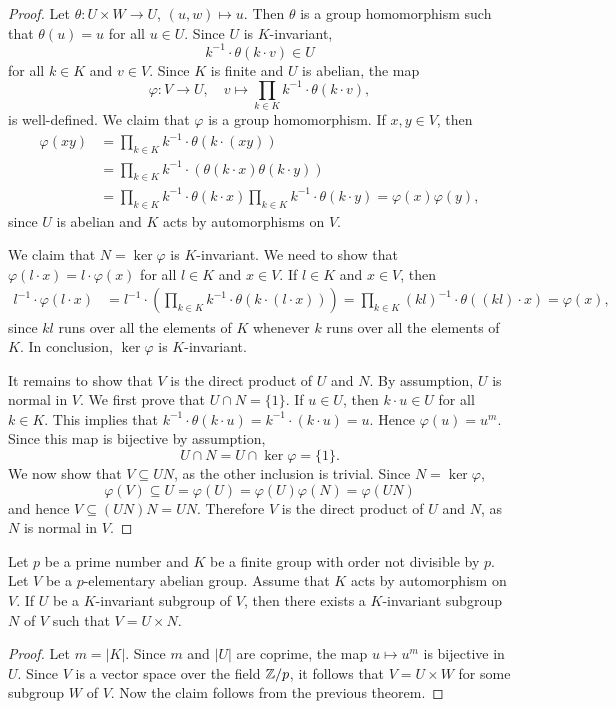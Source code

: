 \begin{proof}
Let $\theta\colon U\times W\to U$, $(u,w)\mapsto u$. Then $\theta$ is a group homomorphism such that 
$\theta(u)=u$ for all $u\in U$. Since $U$ is $K$-invariant, 
\[
k^{-1}\cdot \theta(k\cdot v)\in U
\]
for all $k\in K$ and $v\in V$. 
Since $K$ is finite and $U$ is abelian, 
the map 
\[
\varphi\colon V\to U,\quad 
v\mapsto \prod_{k\in K}k^{-1}\cdot \theta(k\cdot v), 
\]
is well-defined. 
We claim that $\varphi$ is a group homomorphism. If $x,y\in V$, then 
\begin{align*}
    \varphi(xy) &= \prod_{k\in K}k^{-1}\cdot \theta(k\cdot (xy))\\
    &= \prod_{k\in K}k^{-1}\cdot (\theta(k\cdot x)\theta(k\cdot y))\\
    &= \prod_{k\in K}k^{-1}\cdot \theta(k\cdot x) \prod_{k\in K}k^{-1}\cdot \theta(k\cdot y)=\varphi(x)\varphi(y),
\end{align*}
since $U$ is abelian and $K$ acts by automorphisms on $V$. 

We claim that $N=\ker\varphi$ is $K$-invariant. 
We need to show that $\varphi(l\cdot x)=l\cdot\varphi(x)$ for all $l\in K$ and $x\in V$. 
If $l\in K$ and $x\in V$, then 
\begin{align*}
l^{-1}\cdot\varphi(l\cdot x)&=l^{-1}\cdot\left(\prod_{k\in K}k^{-1}\cdot \theta(k\cdot (l\cdot x))\right)=\prod_{k\in K}(kl)^{-1}\cdot\theta( (kl)\cdot x)=\varphi(x),
\end{align*}
since $kl$ runs over all the elements of $K$ whenever $k$ runs over all the elements of $K$.
In conclusion, $\ker\varphi$ is $K$-invariant. 

It remains to show that $V$ is the direct product of $U$ and $N$. By assumption, $U$ is normal in $V$. 
We first prove that $U\cap N=\{1\}$. If $u\in U$, then $k\cdot u\in U$ for all $k\in K$. This implies that 
$k^{-1}\cdot\theta(k\cdot u)=k^{-1}\cdot (k\cdot u)=u$. Hence $\varphi(u)=u^m$. Since this map is bijective by assumption,  
\[
U\cap N=U\cap\ker\varphi=\{1\}.
\]
We now show that $V\subseteq UN$, as the other inclusion is trivial. Since $N=\ker\varphi$,  
\[
\varphi(V)\subseteq U=\varphi(U)=\varphi(U)\varphi(N)=\varphi(UN) 
\]
and hence $V\subseteq (UN)N=UN$. 
Therefore $V$ is the direct product of $U$ and $N$, as $N$ is normal in $V$.
\end{proof}

\begin{corollary}
    Let $p$ be a prime number and $K$ be a finite
    group with order not divisible by $p$. Let $V$ be
    a $p$-elementary abelian group. Assume that $K$ acts
    by automorphism on $V$. If $U$ be a $K$-invariant subgroup of $V$, 
    then there exists a $K$-invariant subgroup $N$ of $V$ 
    such that $V=U\times N$. 
\end{corollary}

\begin{proof}
    Let $m=|K|$. Since $m$ and $|U|$ are coprime, the map 
    $u\mapsto u^m$ is bijective in $U$. Since $V$ is a vector space over the field 
    $\mathbb{Z}/p$, it follows that $V=U\times W$ for some subgroup $W$ of $V$. Now the claim follows
    from the previous theorem. 
\end{proof}